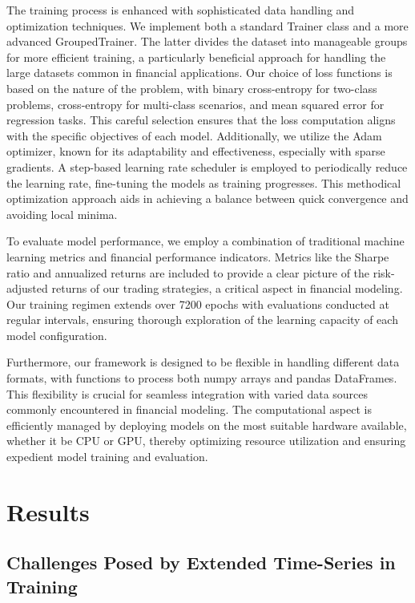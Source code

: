 \documentclass[10pt,twocolumn,letterpaper]{article}
\begin{document}
The training process is enhanced with sophisticated data handling and optimization techniques. We implement both a standard Trainer class and a more advanced GroupedTrainer. The latter divides the dataset into manageable groups for more efficient training, a particularly beneficial approach for handling the large datasets common in financial applications. Our choice of loss functions is based on the nature of the problem, with binary cross-entropy for two-class problems, cross-entropy for multi-class scenarios, and mean squared error for regression tasks. This careful selection ensures that the loss computation aligns with the specific objectives of each model. Additionally, we utilize the Adam optimizer, known for its adaptability and effectiveness, especially with sparse gradients. A step-based learning rate scheduler is employed to periodically reduce the learning rate, fine-tuning the models as training progresses. This methodical optimization approach aids in achieving a balance between quick convergence and avoiding local minima.

To evaluate model performance, we employ a combination of traditional machine learning metrics and financial performance indicators. Metrics like the Sharpe ratio and annualized returns are included to provide a clear picture of the risk-adjusted returns of our trading strategies, a critical aspect in financial modeling. Our training regimen extends over 7200 epochs with evaluations conducted at regular intervals, ensuring thorough exploration of the learning capacity of each model configuration.

Furthermore, our framework is designed to be flexible in handling different data formats, with functions to process both numpy arrays and pandas DataFrames. This flexibility is crucial for seamless integration with varied data sources commonly encountered in financial modeling. The computational aspect is efficiently managed by deploying models on the most suitable hardware available, whether it be CPU or GPU, thereby optimizing resource utilization and ensuring expedient model training and evaluation.

\section{Results} \label{sec:results}

\subsection{Challenges Posed by Extended Time-Series in Training}
\end{document}
